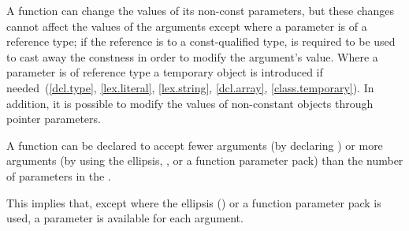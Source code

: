 \pnum
\begin{note}
%
%
%
%
%
%
A function can change the values of its non-const parameters, but these
changes cannot affect the values of the arguments except where a
parameter is of a reference type; if the reference is to
a const-qualified type,  is required to be used to
cast away the constness in order to modify the argument's value. Where a
parameter is of  reference type a temporary object is
introduced if
needed~(\ref{dcl.type}, \ref{lex.literal}, \ref{lex.string}, \ref{dcl.array}, \ref{class.temporary}).
In addition, it is possible to modify the values of non-constant objects through
pointer parameters.
\end{note}

\pnum
{}%
%
A function can be declared to accept fewer arguments (by declaring ) or more arguments (by using the ellipsis,
, or a function parameter pack) than the number of
parameters in the .
\begin{note}
This implies that, except where the ellipsis () or a function
parameter pack is used, a parameter is available for each argument.
\end{note}


